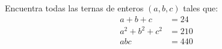 Encuentra todas las ternas de enteros $(a, b, c)$ tales que:
\begin{align*}
a+b+c&=24\\
a^2+b^2+c^2&=210\\
abc&=440
\end{align*}

